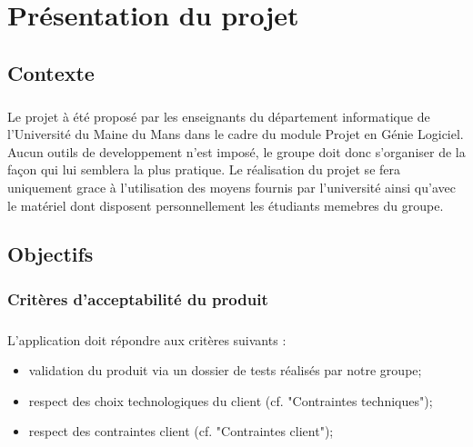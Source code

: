 \chapter{Présentation du projet}
\section{Contexte }
        \paragraph*{}
	Le projet à été proposé par les enseignants du département informatique de l'Université du Maine du Mans 
	dans le cadre du module Projet en Génie Logiciel.
	Aucun outils de developpement n'est imposé, le groupe doit donc s'organiser de la façon qui lui semblera la plus pratique. 
	Le réalisation du projet se fera uniquement grace à l'utilisation des moyens fournis par l'université ainsi qu'avec le matériel dont 
	disposent personnellement les étudiants memebres du groupe. 


\section{Objectifs}
\paragraph*{}


\subsection{Critères d'acceptabilité du produit}
        \paragraph*{}
	L’application doit répondre aux critères suivants :
	\begin{itemize}
  	  	\item validation du produit via un dossier de tests réalisés par notre groupe;
  	  	\item respect des choix technologiques du client (cf. "Contraintes techniques");
  	  	\item respect des contraintes client (cf. "Contraintes client");
	\end{itemize}



